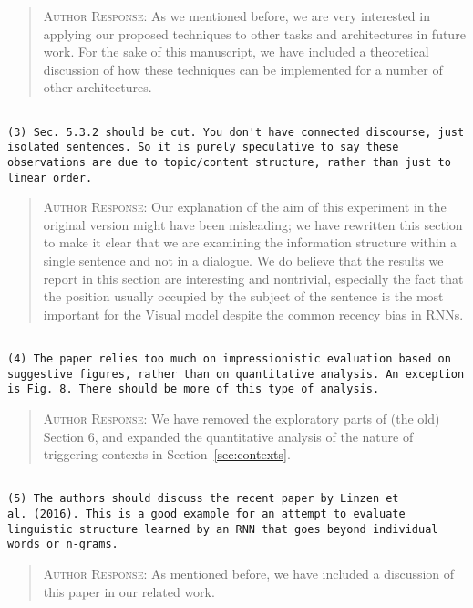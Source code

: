 \begin{quote}
\textsc{Author Response:}  As we mentioned before, we are very interested in 
applying our proposed techniques to other tasks and architectures in future work. 
For the sake of this manuscript, we have included a theoretical discussion of how these techniques can be implemented for a number of other architectures.
\end{quote}
\begin{verbatim}

(3) Sec. 5.3.2 should be cut. You don't have connected discourse, just
isolated sentences. So it is purely speculative to say these
observations are due to topic/content structure, rather than just to
linear order.
\end{verbatim}  
\begin{quote}
\textsc{Author Response:}  Our explanation of the aim of this experiment in the original version might have been misleading; we have rewritten this section to make it clear that we are examining the information structure within a single sentence and not in a dialogue. We do believe that the results we report in this section are interesting and nontrivial, especially the fact that the position usually occupied by the subject of the sentence is the most important for the {\sc Visual} model despite the common recency bias in RNNs.
\end{quote}
\begin{verbatim}

(4) The paper relies too much on impressionistic evaluation based on
suggestive figures, rather than on quantitative analysis. An exception
is Fig. 8. There should be more of this type of analysis.
\end{verbatim}  
\begin{quote}
\textsc{Author Response:}  We have removed the exploratory parts of (the old) Section 6, and expanded the quantitative analysis of the nature of triggering contexts in Section~\ref{sec:contexts}. 
\end{quote}
\begin{verbatim}

(5) The authors should discuss the recent paper by Linzen et
al. (2016). This is a good example for an attempt to evaluate
linguistic structure learned by an RNN that goes beyond individual
words or n-grams.
\end{verbatim}  
\begin{quote}
\textsc{Author Response:}  As mentioned before, we have included a discussion of
this paper in our related work.
\end{quote}
